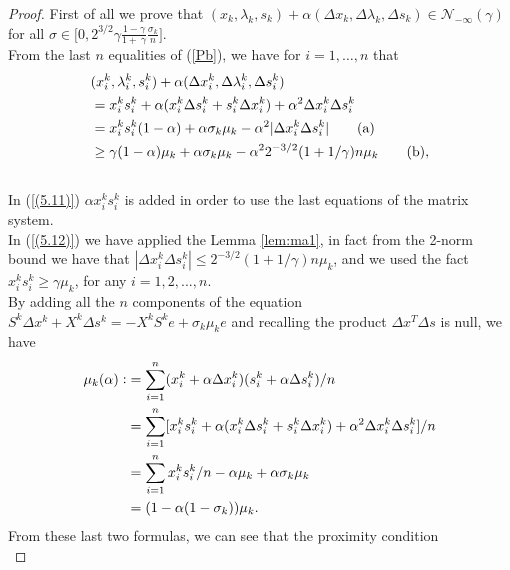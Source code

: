 \documentclass[a4paper,10 pt,titlepage,twoside]{report}
\theoremstyle{plain}
\theoremstyle{definition}
\theoremstyle{remark}
\begin{document}
\begin{proof}
	First of all we prove that $(x_{k}, \lambda_{k}, s_{k})+\alpha(\Delta x_{k},\Delta \lambda_{k},\Delta s_{k})\in\mathcal{N}_{-\infty}(\gamma)$ for all $\sigma \in \bigg[0,2^{3/2}\gamma \frac{1 - \gamma}{1 +\ \gamma}\frac{\sigma_{k}}{n}\bigg]$.\\
	
	From the last $n$ equalities of (\ref{Pb}), we have for $i=1,\dots,n$ that 
	\begin{align}&(x_{i}^{k}, \lambda_{i}^{k}, s_{i}^{k})+\alpha(\Delta x_{i}^{k},\Delta \lambda_{i}^{k},\Delta s_{i}^{k})\notag\\ 
	 &=x_{i}^{k}s_{i}^{k} + \alpha(x_{i}^{k} \Delta s_{i}^{k} + s_{i}^{k} \Delta x_{i}^{k})+\alpha^{2}\Delta x_{i}^{k} \Delta s_{i}^{k}\notag\\
	&=x_{i}^{k}s_{i}^{k}(1 - \alpha) + \alpha \sigma_{k}\mu_{k}-\alpha^{2}|\Delta x_{i}^{k} \Delta s_{i}^{k}| \label{(5.11)}\tag{a}\\
	&\geq \gamma(1 - \alpha)\mu_{k} + \alpha \sigma_{k}\mu_{k}-\alpha^{2}2^{-3/2}(1 + 1/ \gamma)n\mu_{k} \label{(5.12)}\tag{b},
	\end{align}
	\\
	In (\ref{(5.11)}) $\alpha x_{i}^{k}s_{i}^{k}$ is added in order to use the last equations of the matrix system.\\ 
	In (\ref{(5.12)}) we have applied the Lemma \ref{lem:ma1}, in fact from the 2-norm bound we have that $|\Delta x_{i}^{k}\Delta s_{i}^{k}|\leq2^{-3/2}(1 + 1/\gamma)n\mu_{k}$, and we used the fact $x_{i}^{k}s_{i}^{k}\geq \gamma\mu_{k}$, for any $i = 1,2,...,n$. \\
	By adding all the $n$ components of the equation $S^{k}\Delta x^{k} + X^{k} \Delta s^{k} = -X^{k}S^{k}e + \sigma_{k} \mu_{k}e$ and recalling the product $\Delta x^{T} \Delta s$ is null, we have
	\begin{align*}\mu_{k}(\alpha)\vcentcolon&=\sum_{i=1}^{n}(x_{i}^{k} + \alpha\Delta x_{i}^{k})(s_{i}^{k} + \alpha\Delta s_{i}^{k})/n\\
&=\sum_{i=1}^{n}[x_{i}^{k}s_{i}^{k}+\alpha(x_{i}^{k}\Delta s_{i}^{k} + s_{i}^{k}\Delta x_{i}^{k}) +\alpha^{2}\Delta x_{i}^{k}\Delta s_{i}^{k}]/n\\
	&=\sum_{i=1}^{n}x_{i}^{k}s_{i}^{k}/n - \alpha \mu_{k}+\alpha \sigma_{k} \mu_{k} \\
	&=(1-\alpha(1-\sigma_{k}))\mu_{k}.
	\end{align*}
	From these last two formulas, we can see that the proximity condition
	\begin{equation*}

\end{equation*}
\end{proof}
\end{document}
